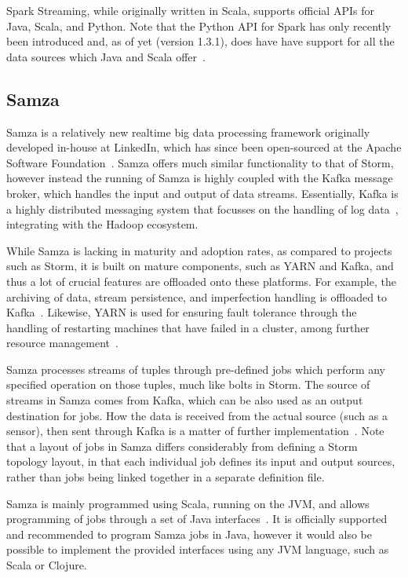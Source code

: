 Spark Streaming, while originally written in Scala, supports official APIs for Java, Scala, and Python. Note that the
Python API for Spark has only recently been introduced and, as of yet (version 1.3.1), does have have support for all
the data sources which Java and Scala offer~\cite{Spark5:online}.



\subsection{Samza} %
\label{ssub:samza}

Samza is a relatively new realtime big data processing framework originally developed in-house at LinkedIn, which has since been
open-sourced at the Apache Software Foundation~\cite{web_samza}. Samza offers much similar functionality to that of
Storm, however instead the running of Samza is highly coupled with the Kafka message broker, which handles the input
and output of data streams. Essentially, Kafka is a highly distributed messaging system that focusses on the handling
of log data~\cite{kreps2011kafka}, integrating with the Hadoop ecosystem.

While Samza is lacking in maturity and adoption rates, as compared to projects such as Storm, it is built on mature
components, such as YARN and Kafka, and thus a lot of crucial features are offloaded onto these platforms. For example,
the archiving of data, stream persistence, and imperfection handling is offloaded to Kafka~\cite{bockermann2014survey}.
Likewise, YARN is used for ensuring fault tolerance through the handling of restarting machines that have failed in a
cluster, among further resource management~\cite{bockermann2014survey}.

Samza processes streams of tuples through pre-defined jobs which perform any specified operation on those tuples, much
like bolts in Storm. The source of streams in Samza comes from Kafka, which can be also used as an output destination
for jobs. How the data is received from the actual source (such as a sensor), then sent through Kafka is a matter of
further implementation~\cite{yangradstack}. Note that a layout of jobs in Samza differs considerably from defining
a Storm topology layout, in that each individual job defines its input and output sources, rather than jobs being
linked together in a separate definition file.

Samza is mainly programmed using Scala, running on the JVM, and allows programming of jobs through a set of Java
interfaces~\cite{Samza6:online}. It is officially supported and recommended to program Samza jobs in Java, however it
would also be possible to implement the provided interfaces using any JVM language, such as Scala or Clojure.

